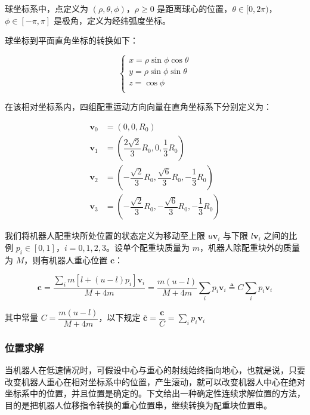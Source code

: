\documentclass[a4paper]{ctexart}
\numberwithin{equation}{section}
\numberwithin{table}{section}
\numberwithin{figure}{section}
\begin{document}
球坐标系中，点定义为 $(\rho, \theta, \phi)$，$\rho\ge 0$ 是距离球心的位置，$\theta \in [0,2\pi)$，$\phi \in [-\pi, \pi]$ 是极角，定义为经纬弧度坐标。

球坐标到平面直角坐标的转换如下：

\begin{equation}
\begin{cases}
  x = \rho\sin\phi\cos\theta \\
  y = \rho\sin\phi\sin\theta \\
  z = \cos\phi \\
\end{cases}
\end{equation}

在该相对坐标系内，四组配重运动方向向量在直角坐标系下分别定义为：

\begin{align}
  \boldsymbol v_0 & = (0,0,R_0) \\
  \boldsymbol v_1 & = (\dfrac{2\sqrt{2}}{3}R_0,0,\dfrac{1}{3}R_0) \\
  \boldsymbol v_2 & = (-\dfrac{\sqrt{2}}{3}R_0,\dfrac{\sqrt{6}}{3}R_0,-\dfrac{1}{3}R_0) \\
  \boldsymbol v_3 & = (-\dfrac{\sqrt{2}}{3}R_0,-\dfrac{\sqrt{6}}{3}R_0,-\dfrac{1}{3}R_0)
\end{align}

我们将机器人配重块所处位置的状态定义为移动至上限 $u\boldsymbol v_i$ 与下限 $l\boldsymbol v_i$ 之间的比例 $p_i\in[0,1]$，$i = 0,1,2,3$。设单个配重块质量为 $m$，机器人除配重块外的质量为 $M$，则有机器人重心位置 $\boldsymbol c$：

\begin{equation}
  \boldsymbol c = \frac{\sum_i m [l + (u-l) p_i] \boldsymbol v_i}{M + 4m} = \frac{m (u-l)}{M + 4m}\sum_i p_i \boldsymbol v_i \triangleq C \sum_i p_i \boldsymbol v_i
  \label{equ_center}
\end{equation}

其中常量 $C=\dfrac{m (u-l)}{M + 4m}$，以下规定 $\overline{\boldsymbol c} = \dfrac{\boldsymbol c}{C} = \sum_i p_i \boldsymbol v_i$

\subsubsection{位置求解}

当机器人在低速情况时，可假设中心与重心的射线始终指向地心，也就是说，只要改变机器人重心在相对坐标系中的位置，产生滚动，就可以改变机器人中心在绝对坐标系中的位置，并且位置是确定的。下文给出一种确定性连续求解位置的方法，目的是把机器人位移指令转换的重心位置串，继续转换为配重块位置串。
\end{document}
